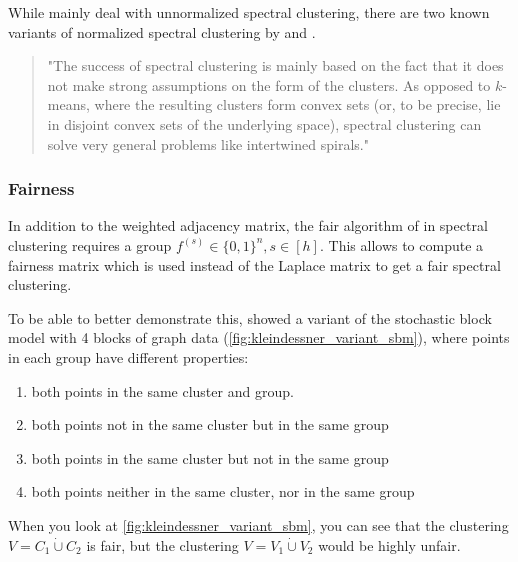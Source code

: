 While \textcite[]{Kleindessner2019} mainly deal with unnormalized spectral clustering, there are two known variants of normalized spectral clustering by \textcite[]{Shi2000} and \textcite[]{Ng2001}.

\begin{quote}
"The success of spectral clustering is mainly based on the fact that it does not make strong assumptions on the form of the clusters. As opposed to $k$-means, where the resulting clusters form convex sets (or, to be precise, lie in disjoint convex sets of the underlying space), spectral clustering can solve very general problems like intertwined spirals."

\autocite[28]{VonLuxburg2007}
\end{quote}

\subsubsection{Fairness}

In addition to the weighted adjacency matrix, the fair algorithm of \textcite[3]{Kleindessner2019} in spectral clustering requires a group $f^{(s)} \in \{0,1\}^n, s \in [h]$. This allows to compute a fairness matrix which is used instead of the Laplace matrix to get a fair spectral clustering. \autocite[3]{Kleindessner2019}

To be able to better demonstrate this, \textcite[4]{Kleindessner2019} showed a variant of the stochastic block model with 4 blocks of graph data (\ref{fig:kleindessner_variant_sbm}), where points in each group have different properties:
\begin{enumerate}
	\item both points in the same cluster and group.
	\item both points not in the same cluster but in the same group
	\item both points in the same cluster but not in the same group
	\item both points neither in the same cluster, nor in the same group
\end{enumerate}

When you look at \autoref{fig:kleindessner_variant_sbm}, you can see that the clustering $V = C_{1} \dot\cup C_{2}$ is fair, but the clustering $V = V_{1} \dot\cup V_{2}$ would be highly unfair. \autocite[4]{Kleindessner2019}

